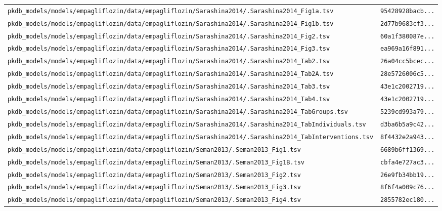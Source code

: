 \documentclass{article}
\begin{document}
\begin{longtable}{ll}
\texttt{pkdb\_models/models/empagliflozin/data/empagliflozin/Sarashina2014/.Sarashina2014\_Fig1a.tsv} & \texttt{95428928bacb...} \\
\texttt{pkdb\_models/models/empagliflozin/data/empagliflozin/Sarashina2014/.Sarashina2014\_Fig1b.tsv} & \texttt{2d77b9683cf3...} \\
\texttt{pkdb\_models/models/empagliflozin/data/empagliflozin/Sarashina2014/.Sarashina2014\_Fig2.tsv} & \texttt{60a1f380087e...} \\
\texttt{pkdb\_models/models/empagliflozin/data/empagliflozin/Sarashina2014/.Sarashina2014\_Fig3.tsv} & \texttt{ea969a16f891...} \\
\texttt{pkdb\_models/models/empagliflozin/data/empagliflozin/Sarashina2014/.Sarashina2014\_Tab2.tsv} & \texttt{26a04cc5bcec...} \\
\texttt{pkdb\_models/models/empagliflozin/data/empagliflozin/Sarashina2014/.Sarashina2014\_Tab2A.tsv} & \texttt{28e5726006c5...} \\
\texttt{pkdb\_models/models/empagliflozin/data/empagliflozin/Sarashina2014/.Sarashina2014\_Tab3.tsv} & \texttt{43e1c2002719...} \\
\texttt{pkdb\_models/models/empagliflozin/data/empagliflozin/Sarashina2014/.Sarashina2014\_Tab4.tsv} & \texttt{43e1c2002719...} \\
\texttt{pkdb\_models/models/empagliflozin/data/empagliflozin/Sarashina2014/.Sarashina2014\_TabGroups.tsv} & \texttt{5239cd993a79...} \\
\texttt{pkdb\_models/models/empagliflozin/data/empagliflozin/Sarashina2014/.Sarashina2014\_TabIndividuals.tsv} & \texttt{d3ba6b5a9c42...} \\
\texttt{pkdb\_models/models/empagliflozin/data/empagliflozin/Sarashina2014/.Sarashina2014\_TabInterventions.tsv} & \texttt{8f4432e2a943...} \\
\texttt{pkdb\_models/models/empagliflozin/data/empagliflozin/Seman2013/.Seman2013\_Fig1.tsv} & \texttt{6689b6ff1369...} \\
\texttt{pkdb\_models/models/empagliflozin/data/empagliflozin/Seman2013/.Seman2013\_Fig1B.tsv} & \texttt{cbfa4e727ac3...} \\
\texttt{pkdb\_models/models/empagliflozin/data/empagliflozin/Seman2013/.Seman2013\_Fig2.tsv} & \texttt{26e9fb34bb19...} \\
\texttt{pkdb\_models/models/empagliflozin/data/empagliflozin/Seman2013/.Seman2013\_Fig3.tsv} & \texttt{8f6f4a009c76...} \\
\texttt{pkdb\_models/models/empagliflozin/data/empagliflozin/Seman2013/.Seman2013\_Fig4.tsv} & \texttt{2855782ec180...} \\

\end{longtable}
\end{document}

